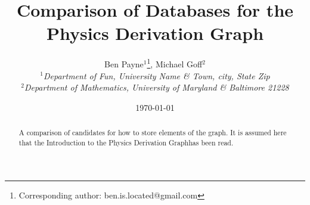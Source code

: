 \documentclass{article}
\newcommand{\pdg}{Physics Derivation Graph}
\begin{document}
\title{Comparison of Databases for the \pdg}

\author{Ben Payne$^{1}$\footnote{Corresponding author: ben.is.located@gmail.com}, Michael Goff$^{2}$\\
{\it $^{1}$Department of Fun, University Name \& Town, city, State Zip}\\
{\it $^{2}$Department of Mathematics, University of Maryland \& Baltimore 21228}}

\date{\today}


\maketitle %

\begin{abstract}
A comparison of candidates for how to store elements of the graph. 
It is assumed here that the Introduction to the \pdg has been read. 
\end{abstract}
\end{document}
